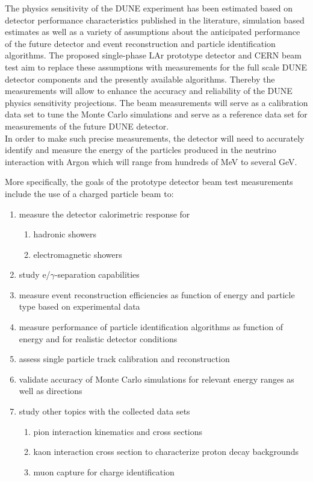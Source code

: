 The physics sensitivity of the DUNE experiment has been estimated based on detector performance characteristics published in the literature, simulation based estimates as well as a variety of assumptions about the anticipated performance of the future detector and event reconstruction and particle identification algorithms.
The proposed single-phase LAr prototype detector and CERN beam test aim to replace these assumptions with measurements for the full scale DUNE detector components and the presently available algorithms. Thereby the measurements will allow to enhance the accuracy and reliability of the DUNE physics sensitivity projections. 
The beam measurements will serve as a calibration data set to tune the Monte Carlo simulations and serve as a reference data set for measurements of the future DUNE detector. \\
%
In order to make such precise measurements, the detector will need to accurately identify and measure the energy of the particles produced in the neutrino interaction with Argon which will range from hundreds of MeV to several GeV.

More specifically, the goals of the prototype detector beam test measurements include
the use of a charged particle beam to:
\begin{enumerate}
\item measure the detector calorimetric response for
\begin{enumerate}
	\item hadronic showers
	\item electromagnetic showers
\end{enumerate}
\item study e/$\gamma$-separation capabilities
\item measure event reconstruction efficiencies as function of energy and particle type based on experimental data
\item measure performance of particle identification algorithms as function of energy and for realistic detector conditions
\item assess single particle track calibration and reconstruction
\item validate accuracy of Monte Carlo simulations for relevant energy ranges as well as directions

\item study other topics with the collected data sets
 \begin{enumerate}
    \item pion interaction kinematics and cross sections
    \item kaon interaction cross section to characterize proton decay backgrounds 
    \item muon capture for charge identification
 \end{enumerate}
\end{enumerate}

